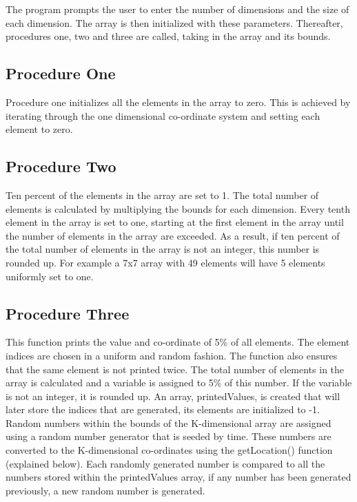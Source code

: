 \documentclass[10pt,onecolumn]{article}
\begin{document}
  \noindent The program prompts the user to enter the number of dimensions and the size of each dimension. The array is then initialized with these parameters. Thereafter, procedures one, two and three are called, taking in the array and its bounds. 
  
  \subsection*{Procedure One}
  Procedure one initializes all the elements in the array to zero. This is achieved by iterating through the one dimensional co-ordinate system and setting each element to zero. 
  
  \subsection*{Procedure Two}
  Ten percent of the elements in the array are set to 1. The total number of elements is calculated by multiplying the bounds for each dimension. Every tenth element in the array is set to one, starting at the first element in the array until the number of elements in the array are exceeded. As a result, if ten percent of the total number of elements in the array is not an integer, this number is rounded up. For example a 7x7 array with 49 elements will have 5 elements uniformly set to one.
  
  \subsection*{Procedure Three}
  This function prints the value and co-ordinate of 5\% of all elements. The element indices are chosen in a uniform and random fashion. The function also ensures that the same element is not printed twice. The total number of elements in the array is calculated and a variable is assigned to 5\% of this number. If the variable is not an integer, it is rounded up. An array, printedValues, is created that will later store the indices that are generated, its elements are initialized to -1. Random numbers within the bounds of the K-dimensional array are assigned using a random number generator that is seeded by time. These numbers are converted to the K-dimensional co-ordinates using the getLocation() function (explained below). Each randomly generated number is compared to all the numbers stored within the printedValues array, if any number has been generated previously, a new random number is generated. \\
  
\end{document}
